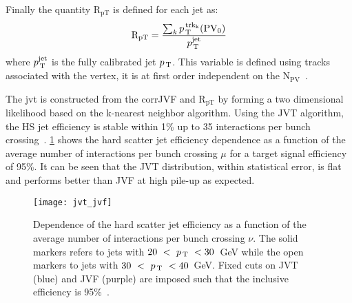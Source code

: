 Finally the quantity $\mathrm{R_{pT}}$ is defined for each jet as:
\begin{equation}
  \label{eq:93}
  \mathrm{R_{pT}} = \frac{\sum_k p_\mathrm{\, T}^\mathrm{\, trk_k}
    (\mathrm{PV_0})}{p_\mathrm{\, T}^{\mathrm{jet}}}
\end{equation}
where $p_\mathrm{\, T}^{\mathrm{jet}}$ is the fully calibrated jet $p_\mathrm{\, T}$. This variable is
defined using tracks associated with the vertex, it is at first order
independent on the N$_{\mathrm{PV}}$~\cite{PileUpPerformance}.

The \gls{jvt} is constructed from the corrJVF and $\mathrm{R_{pT}}$ by forming a
two dimensional likelihood based on the k-nearest neighbor algorithm. Using the
JVT algorithm, the HS jet efficiency is stable within 1\% up to 35 interactions
per bunch crossing~\cite{JVT}. \cref{fig:jvt_jvf} shows the hard scatter jet
efficiency dependence as a function of the average number of interactions per
bunch crossing $\mu$ for a target signal efficiency of 95\%. It can be seen that
the JVT distribution, within statistical error, is flat and performs better than
JVF at high pile-up as expected. \pagebreak[4]
\begin{figure}[!htb]
  \centering
    \texttt{[image: jvt\_jvf]}
    \caption{Dependence of the hard scatter jet efficiency as a function of the
      average number of interactions per bunch crossing $\nu$. The solid markers
    refers to jets with $20~<~p_\mathrm{\, T}~<30$~GeV while the open markers to jets with
    $30~<~p_\mathrm{\, T}~<40$~GeV. Fixed cuts on JVT (blue) and JVF (purple) are imposed
    such that the inclusive efficiency is 95\%~\cite{JVT}.}
    \label{fig:jvt_jvf}
\end{figure}
